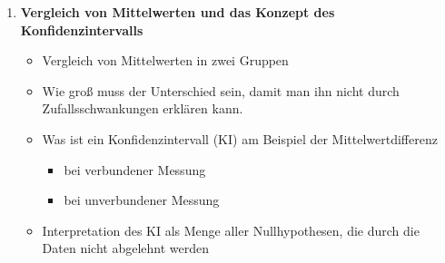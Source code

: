 \documentclass[a4paper,fontsize=12pt]{scrartcl}
\begin{document}
\begin{enumerate}
  \item{\textbf{Vergleich von Mittelwerten und das Konzept des Konfidenzintervalls}
    \begin{itemize}
      \item{Vergleich von Mittelwerten in zwei Gruppen}
      \item{Wie groß muss der Unterschied sein, damit man ihn nicht durch Zufallsschwankungen
      erklären kann.}
      \item{Was ist ein Konfidenzintervall (KI) am Beispiel der Mittelwertdifferenz}
       \begin{itemize}
        \item{bei verbundener Messung}
        \item{bei unverbundener Messung}
       \end{itemize}
       \item{Interpretation des KI als Menge aller Nullhypothesen, die durch die Daten nicht abgelehnt werden}
    \end{itemize}
  }
  
  
\end{enumerate}



\end{document}
